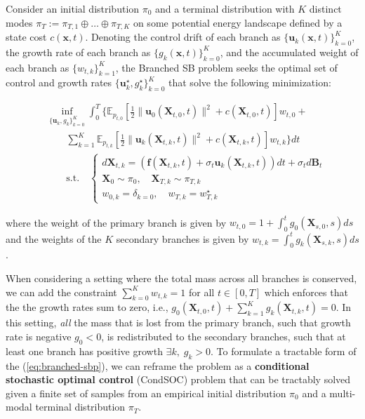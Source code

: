 \documentclass{article}
\begin{document}
\begin{definition}\label{def:branched-sbp}
    Consider an initial distribution $\pi_0$ and a terminal distribution with $K$ distinct modes $\pi_T:=\pi_{T, 1}\oplus \dots\oplus \pi_{T, K}$ on some potential energy landscape defined by a state cost $c(\boldsymbol{x},t)$. Denoting the control drift of each branch as $\{\boldsymbol{u}_{ k}(\boldsymbol{x},t)\}_{k=0}^K$, the growth rate of each branch as $\{g_{k}(\boldsymbol{x},t)\}_{k=0}^K$, and the accumulated weight of each branch as $\{w_{t, k}\}_{k=1}^K$, the Branched SB problem seeks the optimal set of control and growth rates $\{\boldsymbol{u}^\star_{k},g_{k}^\star\}_{k=0}^K$ that solve the following minimization:
    \begin{small}
    \begin{align}
        &\inf_{\{\boldsymbol{u}_{k},g_{k}\}_{k=0}^K}\int_0^T\bigg\{\mathbb{E}_{p_{t, 0}}\left[\frac{1}{2}\|\boldsymbol{u}_{0}(\boldsymbol{X}_{t, 0},t)\|^2+c(\boldsymbol{X}_{t, 0},t)\right]w_{t, 0}+\\
        &\quad\quad \sum_{k=1}^K\mathbb{E}_{p_{t, k}}\left[\frac{1}{2}\|\boldsymbol{u}_{k}(\boldsymbol{X}_{t, k},t)\|^2+c(\boldsymbol{X}_{t,k},t)\right]w_{t, k}\bigg\}dt\tag{Branched SB Problem}\label{eq:branched-sbp}\\
        &\quad \quad \text{s.t.}\quad \begin{cases}
            d\boldsymbol{X}_{t, k}=(\boldsymbol{f}(\boldsymbol{X}_{t,k},t)+\sigma_t\boldsymbol{u}_{k}(\boldsymbol{X}_{t,k},t))dt+\sigma_td\boldsymbol{B}_t\\
            \boldsymbol{X}_0\sim \pi_0, \quad \boldsymbol{X}_{T, k}\sim \pi_{T, k}\\
            w_{0, k}=\delta_{k=0}, \quad w_{T,k}=w^\star_{T,k}
        \end{cases}\nonumber
    \end{align}
    \end{small}
    where the weight of the primary branch is given by $w_{t, 0}=1+\int_0^tg_0(\boldsymbol{X}_{s,0},s)ds$ and the weights of the $K$ secondary branches is given by $w_{t, k}=\int_0^tg_k(\boldsymbol{X}_{s,k},s)ds$.
\end{definition}

When considering a setting where the total mass across all branches is conserved, we can add the constraint $\sum_{k=0}^Kw_{t, k}=1$ for all $t\in [0,T]$ which enforces that the the growth rates sum to zero, i.e., $g_{0}(\boldsymbol{X}_{t, 0},t)+\sum_{k=1}^Kg_{k}(\boldsymbol{X}_{t, k},t)=0$. In this setting, \textit{all} the mass that is lost from the primary branch, such that growth rate is negative $g_{0}<0$, is redistributed to the secondary branches, such that at least one branch has positive growth $\exists k, \; g_{k}> 0$. To formulate a tractable form of the (\ref{eq:branched-sbp}), we can reframe the problem as a \textbf{conditional stochastic optimal control} (CondSOC) problem that can be tractably solved given a finite set of samples from an empirical initial distribution $\pi_0$ and a multi-modal terminal distribution $\pi_T$.
\end{document}
